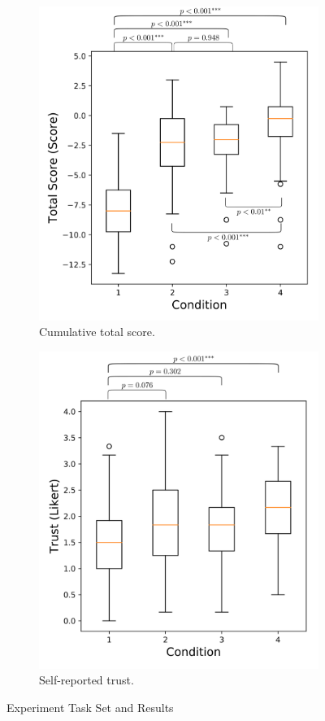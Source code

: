 \begin{figure}[tbp]
\begin{subfigure}[b]{0.30\linewidth}
        \includegraphics[width=0.9\linewidth]{Figures/total_score_box.png}
        \caption{Cumulative total score.}
        \label{fig:score_box}
    \end{subfigure} 
    \hfill
    \begin{subfigure}[b]{0.30\linewidth}
        \centering
        \includegraphics[width=0.9\linewidth]{Figures/trust_box.png}
        \caption{Self-reported trust.}
        \label{fig:trust_box}
    \end{subfigure} 
    \caption{Experiment Task Set and Results}
    \label{fig:taskset_results}
    \vspace{-0.5cm}
\end{figure}
